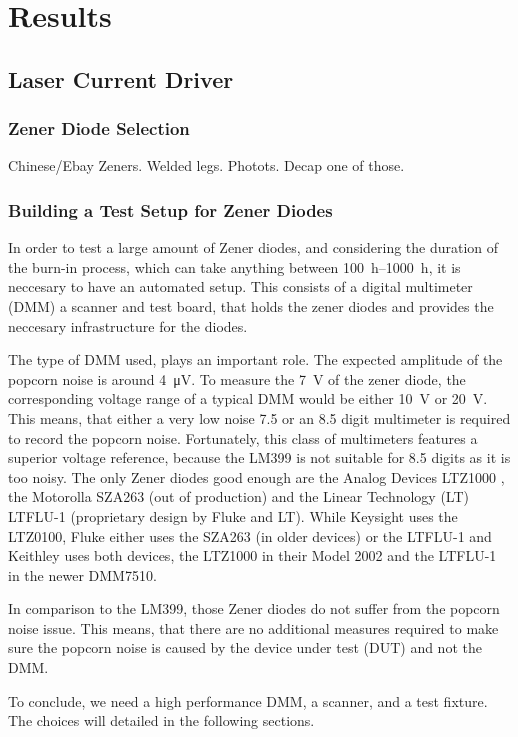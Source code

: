 \chapter{Results}
\section{Laser Current Driver}
\subsection{Zener Diode Selection}
Chinese/Ebay Zeners. Welded legs. Photots. Decap one of those.

\subsection{Building a Test Setup for Zener Diodes}
In order to test a large amount of Zener diodes, and considering the duration of the burn-in process, which can take anything between \qtyrange{100}{1000}{\hour}, it is neccesary to have an automated setup. This consists of a digital multimeter (DMM) a scanner and test board, that holds the zener diodes and provides the neccesary infrastructure for the diodes.

The type of DMM used, plays an important role. The expected amplitude of the popcorn noise is around \qty{4}{\micro\volt}. To measure the \qty{7}{\volt} of the zener diode, the corresponding voltage range of a typical DMM would be either \qty{10}{\volt} or \qty{20}{\volt}. This means, that either a very low noise \num{7.5} or an \num{8.5} digit multimeter is required to record the popcorn noise. Fortunately, this class of multimeters features a superior voltage reference, because the LM399 is not suitable for \num{8.5} digits as it is too noisy. The only Zener diodes good enough are the Analog Devices LTZ1000 \cite{}, the Motorolla SZA263 (out of production) and the Linear Technology (LT) LTFLU-1 (proprietary design by Fluke and LT).  While Keysight uses the LTZ0100, Fluke either uses the SZA263 (in older devices) or the LTFLU-1 and Keithley uses both devices, the LTZ1000 in their Model 2002 and the LTFLU-1 in the newer DMM7510.

In comparison to the LM399, those Zener diodes do not suffer from the popcorn noise issue. This means, that there are no additional measures required to make sure the popcorn noise is caused by the device under test (DUT) and not the DMM.

To conclude, we need a high performance DMM, a scanner, and a test fixture. The choices will detailed in the following sections.

